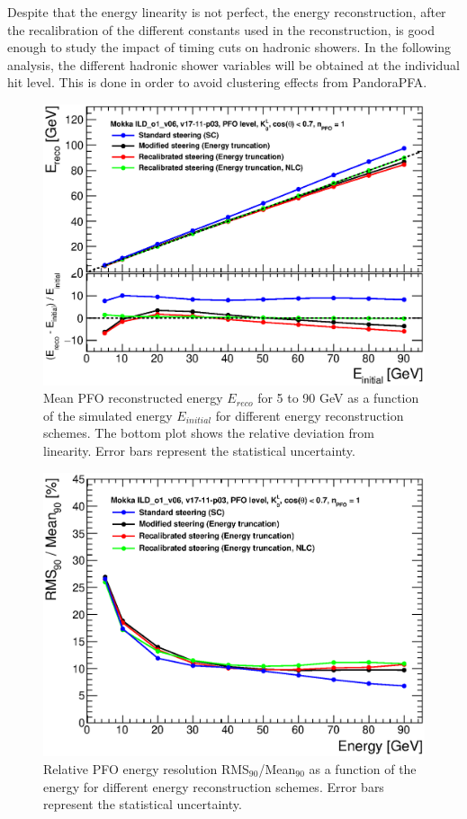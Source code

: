 Despite that the energy linearity is not perfect, the energy reconstruction, after the recalibration of the different constants used in the reconstruction, is good enough to study the impact of timing cuts on hadronic showers. In the following analysis, the different hadronic shower variables will be obtained at the individual hit level. This is done in order to avoid clustering effects from PandoraPFA.

\begin{figure}[htbp!]
  \centering
  \includegraphics[width=0.6\linewidth]{../Thesis_Plots/ILD/CheckCalib/Comparison_linearity_Curves_PFO.eps}
  \caption{Mean PFO reconstructed energy $E_{reco}$ for 5 to 90 GeV \kzeroL{} as a function of the simulated energy $E_{initial}$ for different energy reconstruction schemes. The bottom plot shows the relative deviation from linearity. Error bars represent the statistical uncertainty.} \label{fig:linpfo}
\end{figure}

\begin{figure}[htbp!]
  \centering
  \includegraphics[width=0.6\linewidth]{../Thesis_Plots/ILD/CheckCalib/Comparison_resolution_Curves_PFO.eps}
  \caption{Relative PFO energy resolution RMS$_{90}$/Mean$_{90}$ as a function of the energy for different energy reconstruction schemes. Error bars represent the statistical uncertainty.} \label{fig:resopfo}
\end{figure}

